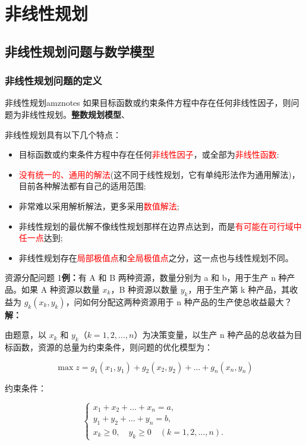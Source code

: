 \ifx\allfiles\undefined

	
	
\else
\fi
    \chapter{非线性规划}
    \section{非线性规划问题与数学模型}
    \subsection{非线性规划问题的定义}
    
\begin{dfnbox}{非线性规划}{amznotes}
    如果目标函数或约束条件方程中存在任何非线性因子，则问题为非线性规划。\textbf{整数规划模型}、
\end{dfnbox}
非线性规划具有以下几个特点：
\begin{itemize}
    \item 目标函数或约束条件方程中存在任何\textcolor{red}{非线性因子}，或全部为\textcolor{red}{非线性函数}:
    \item \textcolor{red}{没有统一的、通用的解法}(这不同于线性规划，它有单纯形法作为通用解法)，目前各种解法都有自己的适用范围;
    \item 非常难以采用解析解法，更多采用\textcolor{red}{数值解法};
    \item 非线性规划的最优解不像线性规划那样在边界点达到，而是\textcolor{red}{有可能在可行域中任一点}达到;
    \item 非线性规划存在\textcolor{red}{局部极值点}和\textcolor{red}{全局极值点}之分，这一点也与线性规划不同。
\end{itemize}

\begin{exbox}{资源分配问题}
1\textbf{例：}有 A 和 B 两种资源，数量分别为 a 和 b，用于生产 n 种产品。如果 A 种资源以数量 \(x_k\)，B 种资源以数量 \(y_k\)，用于生产第 k 种产品，其收益为 \(g_k(x_k, y_k)\)，问如何分配这两种资源用于 n 种产品的生产使总收益最大？
\\
\textbf{解：}

由题意，以 \(x_k\) 和 \(y_k\)（\(k = 1, 2, \dots, n\)）为决策变量，以生产 n 种产品的总收益为目标函数，资源的总量为约束条件，则问题的优化模型为：

\[
\max z = g_1(x_1, y_1) + g_2(x_2, y_2) + \dots + g_n(x_n, y_n)
\]

约束条件：

\[
\begin{cases}
x_1 + x_2 + \dots + x_n = a, \\
y_1 + y_2 + \dots + y_n = b, \\
x_k \geq 0, \quad y_k \geq 0 \quad (k = 1, 2, \dots, n).
\end{cases}
\]
\end{exbox}

